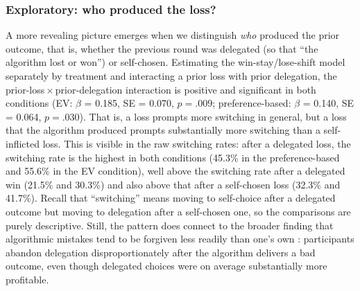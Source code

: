 \documentclass[a4paper, 12pt, fleqn]{article}
\theoremstyle{hypstyle}
\begin{document}
\subsubsection*{Exploratory: who produced the loss?}
A more revealing picture emerges when we distinguish \emph{who} produced the prior outcome, that is, whether the previous round was delegated (so that ``the algorithm lost or won'') or self-chosen. Estimating the win-stay/lose-shift model separately by treatment and interacting a prior loss with prior delegation, the prior-loss\,$\times$\,prior-delegation interaction is positive and significant in both conditions (EV: $\beta$ = 0.185, SE = 0.070, $p = .009$; preference-based: $\beta$ = 0.140, SE = 0.064, $p = .030$). That is, a loss prompts more switching in general, but a loss that the algorithm produced prompts substantially more switching than a self-inflicted loss. This is visible in the raw switching rates: after a delegated loss, the switching rate is the highest in both conditions (45.3\% in the preference-based and 55.6\% in the EV condition), well above the switching rate after a delegated win (21.5\% and 30.3\%) and also above that after a self-chosen loss (32.3\% and 41.7\%). Recall that ``switching'' means moving to self-choice after a delegated outcome but moving to delegation after a self-chosen one, so the comparisons are purely descriptive. Still, the pattern does connect to the broader finding that algorithmic mistakes tend to be forgiven less readily than one's own \citep{Dietvorst2018,Renier2021}: participants abandon delegation disproportionately after the algorithm delivers a bad outcome, even though delegated choices were on average substantially more profitable. 
\end{document}

